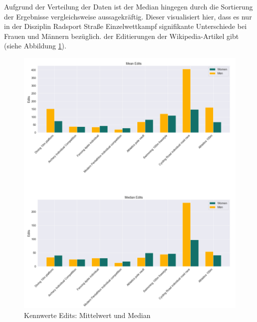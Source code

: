 \documentclass[11pt]{article}
\begin{document}
Aufgrund der Verteilung der Daten ist der Median hingegen durch die Sortierung der Ergebnisse vergleichsweise aussagekräftig. Dieser visualisiert hier, dass es nur in der Disziplin Radsport Straße Einzelwettkampf signifikante Unterschiede bei Frauen und Männern bezüglich. der Editierungen der Wikipedia-Artikel gibt (siehe Abbildung \ref{fig:editcountMeanMedian}).

\begin{figure}
\includegraphics[width=1\textwidth]{figures/editcount_mean_median.png}
\caption[Kennwerte Editierungen: Mittelwert und Median]{Kennwerte Edits: Mittelwert und Median}
\label{fig:editcountMeanMedian}
\end{figure}
\end{document}
